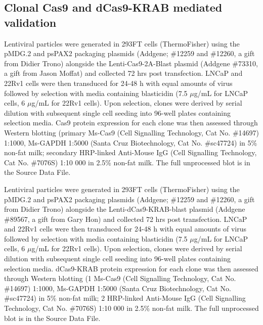 \subsection{Clonal  Cas9 and dCas9-KRAB mediated validation}

Lentiviral particles were generated in 293FT cells (ThermoFisher) using the pMDG.2 and psPAX2 packaging plasmids (Addgene; \#12259 and \#12260, a gift from Didier Trono) alongside the Lenti-Cas9-2A-Blast plasmid (Addgene \#73310, a gift from Jason Moffat) and collected 72 hrs post transfection.
LNCaP and 22Rv1 cells were then transduced for 24-48 h with equal amounts of virus followed by selection with media containing blasticidin (7.5 $\mu$g/mL for LNCaP cells, 6 $\mu$g/mL for 22Rv1 cells).
Upon selection, clones were derived by serial dilution with subsequent single cell seeding into 96-well plates containing selection media.
Cas9 protein expression for each clone was then assessed through Western blotting (primary Ms-Cas9 (Cell Signalling Technology, Cat No. \#14697) 1:1000, Ms-GAPDH 1:5000 (Santa Cruz Biotechnology, Cat No. \#sc47724) in 5\% non-fat milk; secondary HRP-linked Anti-Mouse IgG (Cell Signalling Technology, Cat No. \#7076S) 1:10 000 in 2.5\% non-fat milk.
The full unprocessed blot is in the Source Data File.

Lentiviral particles were generated in 293FT cells (ThermoFisher) using the pMDG.2 and psPAX2 packaging plasmids (Addgene; \#12259 and \#12260, a gift from Didier Trono) alongside the Lenti-dCas9-KRAB-blast plasmid (Addgene \#89567, a gift from Gary Hon) and collected 72 hrs post transfection.
LNCaP and 22Rv1 cells were then transduced for 24-48 h with equal amounts of virus followed by selection with media containing blasticidin (7.5 $\mu$g/mL for LNCaP cells, 6 $\mu$g/mL for 22Rv1 cells).
Upon selection, clones were derived by serial dilution with subsequent single cell seeding into 96-well plates containing selection media.
dCas9-KRAB protein expression for each clone was then assessed through Western blotting (1 \textdegree Ms-Cas9 (Cell Signalling Technology, Cat No. \#14697) 1:1000, Ms-GAPDH 1:5000 (Santa Cruz Biotechnology, Cat No. \#sc47724) in 5\% non-fat milk; 2 \textdegree HRP-linked Anti-Mouse IgG (Cell Signalling Technology, Cat No. \#7076S) 1:10 000 in 2.5\% non-fat milk.
The full unprocessed blot is in the Source Data File.

